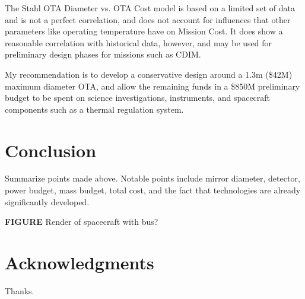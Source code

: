 \documentclass{ws-jai}
\begin{document}
The Stahl OTA Diameter vs. OTA Cost model is based on a limited set of data and is not a perfect correlation, and does not account for influences that other parameters like operating temperature have on Mission Cost.
It does show a reasonable correlation with historical data, however, and may be used for preliminary design phases for missions such as CDIM.\@

My recommendation is to develop a conservative design around a 1.3m (\$42M) maximum diameter OTA, and allow the remaining funds in a \$850M preliminary budget to be spent on science investigations, instruments, and spacecraft components such as a thermal regulation system.

\section{Conclusion}
\label{S:conclusion}
Summarize points made above. Notable points include mirror diameter, detector, power budget, mass budget, total cost, and the fact that technologies are already significantly developed.

\textbf{FIGURE} Render of spacecraft with bus?

\section*{Acknowledgments}
Thanks.


\end{document}

